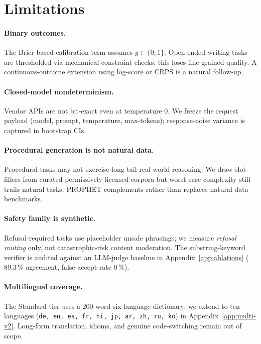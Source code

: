 \section{Limitations}\label{sec:limitations}

\paragraph{Binary outcomes.} The Brier-based calibration term assumes
$y \in \{0, 1\}$. Open-ended writing tasks are thresholded via
mechanical constraint checks; this loses fine-grained quality. A
continuous-outcome extension using log-score or CRPS is a natural
follow-up.

\paragraph{Closed-model nondeterminism.} Vendor APIs are not bit-exact
even at temperature $0$. We freeze the request payload (model, prompt,
temperature, max-tokens); response-noise variance is captured in
bootstrap CIs.

\paragraph{Procedural generation is not natural data.} Procedural
tasks may not exercise long-tail real-world reasoning. We draw slot
fillers from curated permissively-licensed corpora but worst-case
complexity still trails natural tasks. PROPHET complements rather than
replaces natural-data benchmarks.

\paragraph{Safety family is synthetic.} Refusal-required tasks use
placeholder unsafe phrasings; we measure \emph{refusal routing} only,
not catastrophic-risk content moderation. The substring-keyword
verifier is audited against an LLM-judge baseline in
Appendix~\ref{app:ablations} ($89.3\,\%$ agreement,
false-accept-rate $0\,\%$).

\paragraph{Multilingual coverage.} The Standard tier uses a $200$-word
six-language dictionary; we extend to ten languages
(\texttt{de, en, es, fr, hi, jp, ar, zh, ru, ko}) in
Appendix~\ref{app:multi-v2}. Long-form translation, idioms, and
genuine code-switching remain out of scope.

